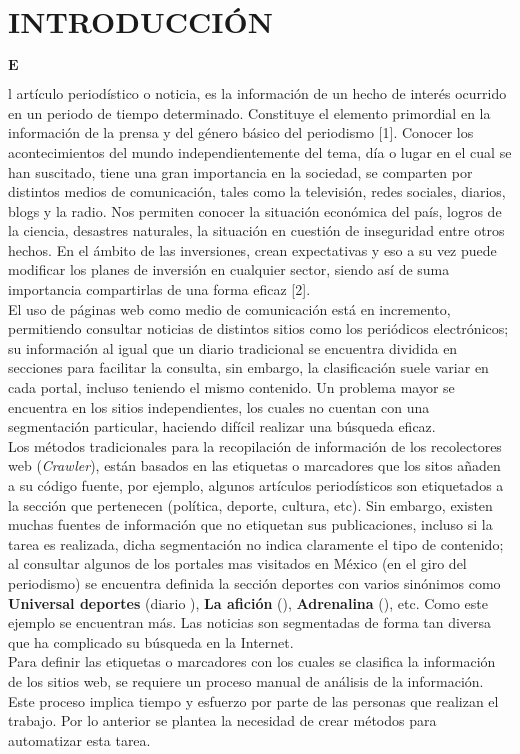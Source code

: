 \section{INTRODUCCIÓN}

 \begin{Large}$\mathbf{E}$\end{Large}l  artículo periodístico o noticia, es la información de un hecho de interés 
  ocurrido en un periodo de tiempo determinado. Constituye el elemento primordial en la información de la prensa y 
  del género básico del periodismo [1]. Conocer los acontecimientos del mundo independientemente del tema, día o 
  lugar en el cual se han suscitado, tiene una gran importancia en la sociedad, se comparten por distintos medios de comunicación, 
  tales como la televisión, redes sociales, diarios, blogs y la radio. Nos permiten conocer la situación económica del país, logros 
  de la ciencia, desastres naturales, la situación en cuestión de inseguridad entre otros hechos. En el ámbito de las inversiones, 
  crean expectativas y eso a su vez puede modificar los planes de inversión en cualquier sector, siendo así de suma importancia 
  compartirlas de una forma eficaz [2].\\

  El uso de páginas web como medio de comunicación está en incremento, permitiendo consultar noticias de distintos sitios como 
los periódicos electrónicos; su información al igual que un diario tradicional se encuentra dividida en secciones para facilitar 
la consulta, sin embargo, la clasificación suele variar en cada portal, incluso teniendo el mismo contenido. Un problema mayor se 
encuentra en los sitios independientes, los cuales no cuentan con una segmentación particular, haciendo difícil realizar una búsqueda eficaz.\\

Los métodos tradicionales para la recopilación de información de los recolectores web (\textit{Crawler}), están basados en las etiquetas o 
marcadores que los sitos añaden a su código fuente, por ejemplo, algunos artículos periodísticos son etiquetados a la sección que pertenecen 
(política, deporte, cultura, etc). Sin embargo, existen muchas fuentes de información que no etiquetan sus publicaciones, incluso si la tarea 
es realizada, dicha segmentación no indica claramente el tipo de contenido; al consultar algunos de los portales mas visitados en México (en el giro del periodismo) 
se encuentra definida la sección deportes con varios sinónimos como \textbf{Universal deportes} (diario ), \textbf{La afición} 
(), \textbf{Adrenalina} (), etc. Como este ejemplo se encuentran más. Las noticias son segmentadas de forma tan diversa que 
ha complicado su búsqueda en la Internet.\\

Para definir las etiquetas o marcadores con los cuales se clasifica la información de los sitios web, se requiere un proceso manual de análisis de 
la información. Este proceso implica tiempo y esfuerzo por parte de las personas que realizan el trabajo. Por lo anterior se plantea la necesidad de crear 
métodos para automatizar esta tarea.